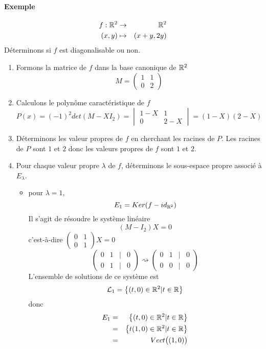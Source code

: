 \paragraph{Exemple}
\begin{eqnarray*}
  f: \mathbb{R}^2 &\rightarrow& \mathbb{R}^2 \\
  (x, y) &\mapsto& (x + y, 2y)
\end{eqnarray*}
Déterminons si $f$ est diagonalisable ou non.
\begin{enumerate}[(1)]
  \item Formons la matrice de $f$ dans la base canonique de $\mathbb{R}^2$
    $$M = \begin{pmatrix} 1 & 1 \\ 0 & 2 \end{pmatrix}$$
  
  \item Calculons le polynôme caractéristique de $f$
    $$P(x) = (-1)^2 det(M - X I_2) = \begin{vmatrix} 1-X & 1 \\ 0 & 2-X \end{vmatrix} = (1-X)(2-X)$$
    
  \item Déterminons les valeur propres de $f$ en cherchant les racines de $P$. Les racines de $P$ sont $1$ et $2$ donc les valeurs propres de $f$ sont $1$ et $2$.
  
  \item Pour chaque valeur propre $\lambda$ de $f$, déterminons le sous-espace propre associé à $E_\lambda$.
    \begin{itemize}
      \item pour $\lambda = 1$, 
        $$E_1 = Ker(f - id_{\mathbb{R}^2})$$
        Il s'agit de résoudre le système linéaire
        $$(M - I_2) X = 0$$
        c'est-à-dire $\begin{pmatrix} 0 & 1 \\ 0 & 1 \end{pmatrix} X = 0$
        $$\begin{pmatrix} 0 & 1 & \vert & 0 \\ 0 & 1 & \vert & 0 \end{pmatrix} \rightsquigarrow
          \begin{pmatrix} 0 & 1 & \vert & 0 \\ 0 & 0 & \vert & 0 \end{pmatrix}$$
        L'ensemble de solutions de ce système est
        $$\mathcal{L}_1 = \left\{(t, 0) \in \mathbb{R}^2 \vert t \in \mathbb{R} \right\}$$
        donc 
        \begin{eqnarray*}
          E_1 &=& \left\{(t, 0) \in \mathbb{R}^2 \vert t \in \mathbb{R} \right\} \\
            &=& \left\{t(1, 0) \in \mathbb{R}^2 \vert t \in \mathbb{R} \right\} \\
            &=& Vect\big((1, 0)\big)
        \end{eqnarray*}
        

\end{itemize}
\end{enumerate}
